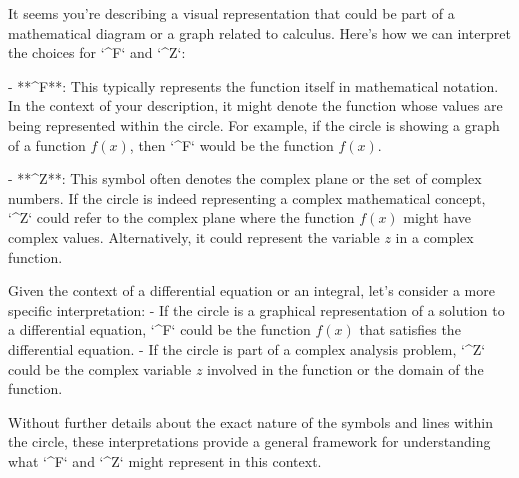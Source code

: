 It seems you're describing a visual representation that could be part of a mathematical diagram or a graph related to calculus. Here's how we can interpret the choices for `^F` and `^Z`:

- **^F**: This typically represents the function itself in mathematical notation. In the context of your description, it might denote the function whose values are being represented within the circle. For example, if the circle is showing a graph of a function \( f(x) \), then `^F` would be the function \( f(x) \).

- **^Z**: This symbol often denotes the complex plane or the set of complex numbers. If the circle is indeed representing a complex mathematical concept, `^Z` could refer to the complex plane where the function \( f(x) \) might have complex values. Alternatively, it could represent the variable \( z \) in a complex function.

Given the context of a differential equation or an integral, let’s consider a more specific interpretation:
- If the circle is a graphical representation of a solution to a differential equation, `^F` could be the function \( f(x) \) that satisfies the differential equation.
- If the circle is part of a complex analysis problem, `^Z` could be the complex variable \( z \) involved in the function or the domain of the function.

Without further details about the exact nature of the symbols and lines within the circle, these interpretations provide a general framework for understanding what `^F` and `^Z` might represent in this context.